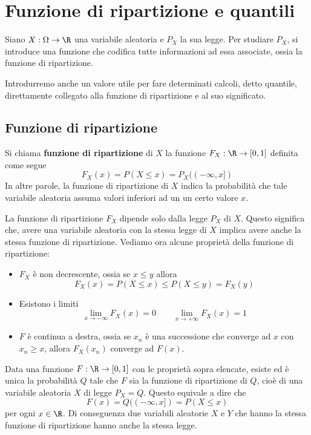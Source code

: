 \section{Funzione di ripartizione e quantili}
Siano $X : \Omega \to \R$ una variabile aleatoria e $P_X$ la sua legge. Per studiare $P_X$, si
introduce una funzione che codifica tutte informazioni ad essa associate, ossia la funzione di
ripartizione.

Introdurremo anche un valore utile per fare determinati calcoli, detto quantile, direttamente
collegato alla funzione di ripartizione e al suo significato.

\subsection{Funzione di ripartizione}
\begin{definition}
	Si chiama \textbf{funzione di ripartizione} di $X$ la funzione $F_X : \R \to [0,1]$ definita
	come segue
	\[ F_X(x) = P (X \leq x) = P_X ((-\infty, x]) \]
	In altre parole, la funzione di ripartizione di $X$ indica la probabilità che tale variabile
	aleatoria assuma valori inferiori ad un un certo valore $x$.
\end{definition}

La funzione di ripartizione $F_X$ dipende solo dalla legge $P_X$ di $X$. Questo significa che,
avere una variabile aleatoria con la stessa legge di $X$ implica avere anche la stessa funzione
di ripartizione. Vediamo ora alcune proprietà della funzione di ripartizione:
\begin{itemize}
	\item $F_X$ è non decrescente, ossia se $x \leq y$ allora
	      \[ F_X(x) = P(X \leq x) \leq P(X \leq y) = F_X(y) \]
	\item Esistono i limiti
	      \[ \lim_{x \to -\infty} F_X(x) = 0 \quad \quad \lim_{x \to +\infty} F_X(x) = 1 \]
	\item $F$ è continua a destra, ossia se $x_n$ è una successione che converge ad $x$ con
	      $x_n \geq x$, allora $F_X(x_n)$ converge ad $F(x)$.
\end{itemize}

\begin{proposition}
	Data una funzione $F : \R \to [0,1]$ con le proprietà sopra elencate, esiste ed è unica la
	probabilità $Q$ tale che $F$ sia la funzione di ripartizione di $Q$, cioè di una variabile
	aleatoria $X$ di legge $P_X = Q$. Questo equivale a dire che
	\[ F(x) = Q((-\infty, x]) = P(X \leq x) \]
	per ogni $x \in \R$. Di conseguenza due variabili aleatorie $X$ e $Y$ che hanno la stessa
	funzione di ripartizione hanno anche la stessa legge.
\end{proposition}

